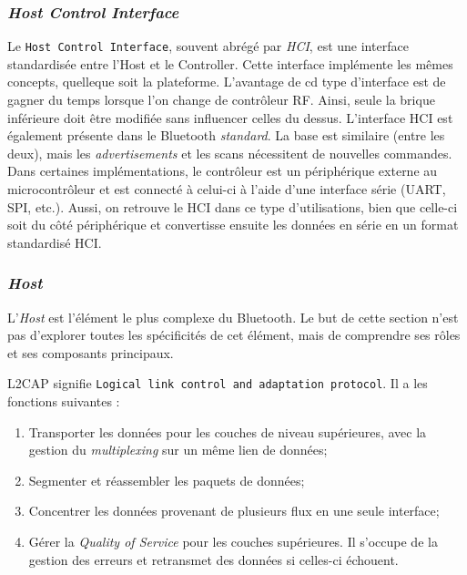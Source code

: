 \subsubsection{\textit{Host Control Interface}}

Le \texttt{Host Control Interface}, souvent abrégé par \textit{HCI}, est une interface standardisée entre l'Host et le Controller. Cette interface implémente les mêmes concepts, quelleque soit la plateforme. L'avantage de cd type d'interface est de gagner du temps lorsque l'on change de contrôleur RF. Ainsi, seule la brique inférieure doit être modifiée sans influencer celles du dessus. L'interface HCI est également présente dans le Bluetooth \textit{standard}. La base est similaire (entre les deux), mais les \textit{advertisements} et les scans nécessitent de nouvelles commandes. \\

Dans certaines implémentations, le contrôleur est un périphérique externe au microcontrôleur et est connecté à celui-ci à l'aide d'une interface série (UART, SPI, etc.). Aussi, on retrouve le HCI dans ce type d'utilisations, bien que celle-ci soit du côté périphérique et convertisse ensuite les données en série en un format standardisé HCI.

\subsubsection{\textit{Host}}


L'\textit{Host} est l'élément le plus complexe du Bluetooth. Le but de cette section n'est pas d'explorer toutes les spécificités de cet élément, mais de comprendre ses rôles et ses composants principaux.




L2CAP signifie \texttt{Logical link control and adaptation protocol}. Il a les fonctions suivantes : 
\begin{enumerate}
    \item Transporter les données pour les couches de niveau supérieures, avec la gestion du \textit{multiplexing} sur un même lien de données;
    \item Segmenter et réassembler les paquets de données;
    \item Concentrer les données provenant de plusieurs flux en une seule interface;
    \item Gérer la \textit{Quality of Service} pour les couches supérieures. Il s'occupe de la gestion des erreurs et retransmet des données si celles-ci échouent.
\end{enumerate}


